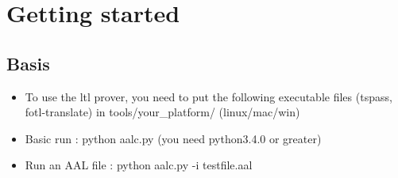 \section{Getting started}

\subsection{Basis}
\begin{itemize}
  \item To use the ltl prover, you need to put the following executable files (tspass, fotl-translate) in tools/your\_platform/ (linux/mac/win)
  \item Basic run : python aalc.py (you need python3.4.0 or greater)
  \item Run an AAL file : python aalc.py -i testfile.aal
\end{itemize}

